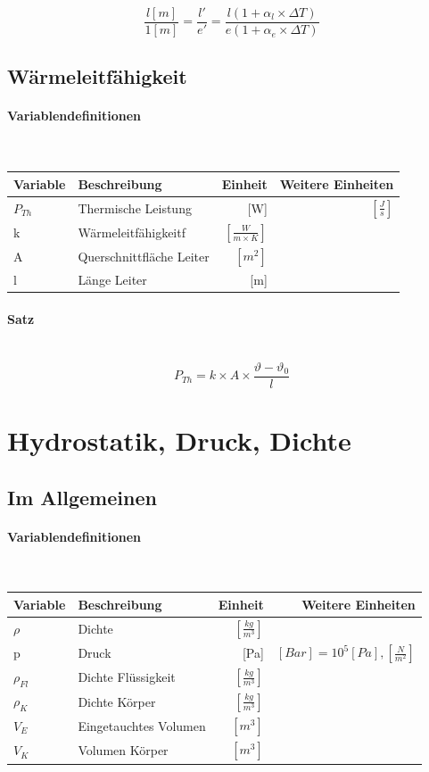 \documentclass[a4paper,10pt]{article}
\newcommand{\lbparagraph}[1]{\paragraph{#1}\mbox{}\\}
\begin{document}
\begin{equation}
    \frac{l[m]}{1[m]} = \frac{l'}{e'} = \frac{l(1 + {\alpha}_l \times {\Delta}T)}{e(1 + {\alpha}_e \times {\Delta}T)}
\end{equation}

\subsection{Wärmeleitfähigkeit}

\lbparagraph{Variablendefinitionen}

\begin{tabular}{l|l|r|r}
    Variable & Beschreibung & Einheit & Weitere Einheiten \\
    \hline
    $P_{Th}$ & Thermische Leistung & [W] & $[\frac{J}{s}]$ \\
    k & Wärmeleitfähigkeitf & $[\frac{W}{m \times K}]$ & \\
    A & Querschnittfläche Leiter & $[m^2]$ & \\
    l & Länge Leiter & [m] &
\end{tabular}

\lbparagraph{Satz}

\begin{equation}
    P_{Th} = k \times A \times \frac{\vartheta - {\vartheta}_0}{l}
\end{equation}

\section{Hydrostatik, Druck, Dichte}

\subsection{Im Allgemeinen}

\lbparagraph{Variablendefinitionen}

\begin{tabular}{l|l|r|r}
    Variable & Beschreibung & Einheit & Weitere Einheiten \\
    \hline
    $\rho$ & Dichte & $[\frac{kg}{m^3}]$ & \\
    p & Druck & [Pa] & $[Bar] =10^5 [Pa], [\frac{N}{m^2}]$ \\
    ${\rho}_{Fl}$ & Dichte Flüssigkeit & $[\frac{kg}{m^3}]$ & \\
    ${\rho}_K$ & Dichte Körper & $[\frac{kg}{m^3}]$ & \\
    $V_E$ & Eingetauchtes Volumen & $[m^3]$ & \\
    $V_K$ & Volumen Körper & $[m^3]$ &
\end{tabular}
\end{document}
